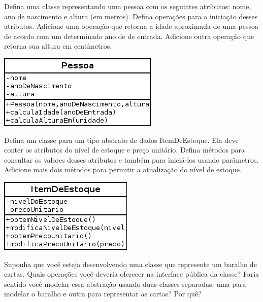 \documentclass[12pt]{exam}
\begin{document}
\begin{questions}
    \question
      Defina uma classe representando uma pessoa com os seguintes atributos: nome, ano de nascimento e altura (em metros). Defina operações para 
      a iniciação desses atributos. Adicione uma operação que retorna a idade aproximada de uma pessoa de acordo com um determinado ano de de entrada.
      Adicione outra operação que retorna sua altura em centímetros.
      \begin{solution}
	\begin{center}
	  \includegraphics[width=.6\textwidth]{./exercicios-capitulo1-e5.png}
	\end{center}
      \end{solution}
    
    \question 
      Defina um classe para um tipo abstrato de dados ItemDeEstoque. Ela deve conter os atributos do nível de estoque e preço unitário. Defina métodos para 
      consultar os valores desses atributos e também para iniciá-los usando parâmetros. Adicione mais dois métodos para permitir a atualização do nível
      de estoque.
      \begin{solution}
	\begin{center}
	  \includegraphics[width=.6\textwidth]{./exercicios-capitulo1-e6.png}
	\end{center}
      \end{solution}
    
    \question 
      Suponha que você esteja desenvolvendo uma classe que represente um baralho de cartas. Quais operações você deveria oferecer na interface pública 
      da classe? Faria sentido você modelar essa abstração usando duas classes separadas: uma para modelar o baralho e outra para representar as cartas?
      Por quê?
      \begin{solution}
      

\end{solution}
\end{questions}
\end{document}
